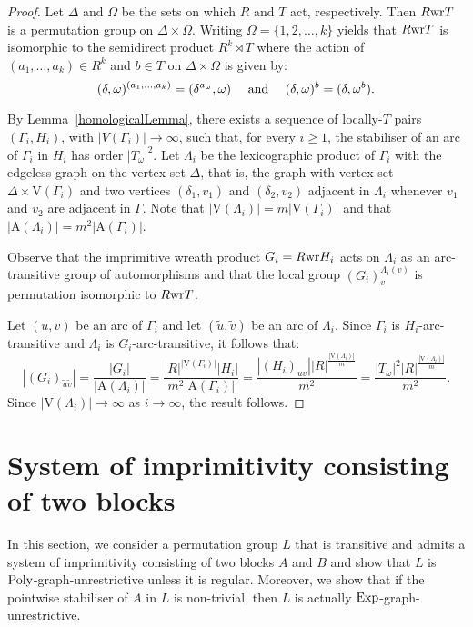 \documentclass{amsart}
\theoremstyle{definition}
\begin{document}
\begin{proof}
Let $\Delta$ and $\Omega$ be the sets on which $R$ and $T$ act, respectively. Then $R {\mathop{\rm wr}} T$ is a permutation group on $\Delta \times \Omega$. Writing $\Omega = \{1,2, \ldots, k\}$ yields that $R{\mathop{\rm wr}} T$ is isomorphic to the semidirect product $R^k\rtimes T$ where the action of
 $(a_1, \ldots, a_k) \in R^k$ and $b\in T$ on $\Delta \times \Omega$ is given by:
$$
 (\delta,\omega)^{(a_1,\ldots,a_k)} = (\delta^{a_\omega},\omega) \quad \hbox{ and }  \quad
 (\delta,\omega)^{b} = (\delta,\omega^b). 
$$

By Lemma~\ref{homologicalLemma}, there exists a sequence of locally-$T$ pairs $(\Gamma_i,H_i)$, with $|V(\Gamma_i)| \to \infty$, such that, for every $i\geq 1$, the stabiliser of an arc of $\Gamma_i$ in $H_i$ has order $|T_\omega|^2$. Let $\Lambda_i$ be the lexicographic product of $\Gamma_i$ with the edgeless graph on the vertex-set $\Delta$,  that is, the graph with vertex-set $\Delta \times {\mathrm V}(\Gamma_i)$ and two vertices $(\delta_1,v_1)$ and  $(\delta_2,v_2)$ adjacent in $\Lambda_i$ whenever $v_1$ and $v_2$ are adjacent in $\Gamma$.
Note that $|{\mathrm V}(\Lambda_i)|=m|{\mathrm V}(\Gamma_i)|$ and that $|{\mathrm A}(\Lambda_i)|=m^2 |{\mathrm A}(\Gamma_i)|$. 

Observe that the imprimitive wreath product $G_i=R{\mathop{\rm wr}} H_i$ acts on $\Lambda_i$ as an arc-transitive group of automorphisms and that the local group $(G_i)_v^{\Lambda_i(v)}$ is permutation isomorphic to $R {\mathop{\rm wr}} T$.

Let $(u,v)$ be an arc of $\Gamma_i$ and let $({{\tilde{u}}},{{\tilde{v}}})$ be an arc of $\Lambda_i$. Since $\Gamma_i$ is $H_i$-arc-transitive and $\Lambda_i$ is $G_i$-arc-transitive, it follows that:
\begin{equation*}
\label{eqn:Gtutv}
 |(G_i)_{{{\tilde{u}}}{{\tilde{v}}}}| = \frac{|G_i|}{|{\mathrm A}(\Lambda_i)|}    = \frac{|R|^{|{\mathrm V}(\Gamma_i)|} |H_i|}{m^2 |{\mathrm A}(\Gamma_i)|}= \frac{|(H_i)_{uv}||R|^{\frac{|{\mathrm V}(\Lambda_i)|}{m}}}{m^2}
 =\frac{|T_\omega|^2|R|^{\frac{|{\mathrm V}(\Lambda_i)|}{m}}}{m^2}.
\end{equation*}
Since $|{\mathrm V}(\Lambda_i)| \to  \infty$ as $i\to \infty$, the result follows.
\end{proof}

\section{System of imprimitivity consisting of two blocks}
\label{sec:TwoBlocks}
In this section, we consider a permutation group $L$ that is transitive and admits a system of imprimitivity consisting of two blocks $A$ and $B$ and show that $L$ is ${\mathop{\rm Poly}}$-graph-unrestrictive unless it is regular. Moreover, we show that if the pointwise stabiliser of $A$ in $L$ is non-trivial, then $L$ is actually ${\mathop{\rm Exp}}$-graph-unrestrictive.
\end{document}
